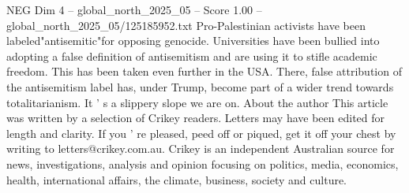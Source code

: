 \begin{textsample}{NEG Dim 4 – global\_north\_2025\_05 – Score 1.00 – global\_north\_2025\_05/125185952.txt}
Pro-Palestinian activists have been labeled"antisemitic"for opposing genocide.
Universities have been bullied into adopting a false definition of antisemitism and are using it to stifle academic freedom.
This has been taken even further in the USA.
There, false attribution of the antisemitism label has, under Trump, become part of a wider trend towards totalitarianism.
It ' s a slippery slope we are on.
About the author This article was written by a selection of Crikey readers.
Letters may have been edited for length and clarity.
If you ' re pleased, peed off or piqued, get it off your chest by writing to letters@crikey.com.au.
Crikey is an independent Australian source for news, investigations, analysis and opinion focusing on politics, media, economics, health, international affairs, the climate, business, society and culture.

\end{textsample}
